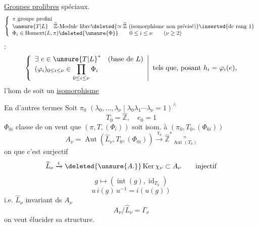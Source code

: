 \uline{Groupes prolibres} spéciaux.
\[
\left\{\begin{array}{l}
\pi\ \text{groupe profini}\\
\unsure{T|L}\quad\widehat{\mathbb Z}\text{-Module libre}
\deleted{\simeq\widehat{\mathbb Z}\text{ (isomorphisme non précisé)}}\inserted{\text{de rang }1}\\
\Phi_i\in\operatorname{Homext}(L,\pi)\deleted{\unsure{\Phi}}
\qquad0\leq i\leq\nu\qquad(\nu\geq2)
\end{array}\right.
\]
 :
\[
\left\{\begin{array}{l}
\exists\ e\in\unsure{T|L}^*\quad(\text{base de }L)\\
(\varphi_i)_{0\leq i\leq\nu}\in\displaystyle\prod_{0\leq i\leq\nu}\Phi_i
\end{array}\right|\ \text{tels que, posant }h_i=\varphi_i(e),
\]
l'hom de
soit un \uline{isomorphisme}

En d'autres termes
Soit $\pi_0$  
$(\lambda_0,\ldots,\lambda_\nu\mid\lambda_0\lambda_1\cdots\lambda_\nu=1)^{\wedge}$
\[
T_0=\widehat{\mathbb Z},\quad e_0=1
\]
$\Phi_{0i}$ classe de
on veut que $(\pi,T,(\Phi_i))$ soit isom. à $(\pi_0,T_0,(\Phi_{0i}))$
\[
A_\nu=\operatorname{Aut}(\widehat L_\nu,T_0,(\Phi_{0i}))
\xrightarrow{\chi_\nu}\widehat{\mathbb Z}^{*}
\underset{\operatorname{Aut}(T_0)}{\text{''}}
\]
on  que c'est surjectif
\[
\widehat L_\nu\xrightarrow{i}\deleted{\unsure{A.}}\operatorname{Ker}\chi_\nu\subset A_\nu
\qquad\text{injectif}
\]
\[
g\longmapsto(\operatorname{int}(g),\operatorname{id}_{T_0})
\]
\[
u\,i(g)\,u^{-1}=i(u(g))
\]
i.e. $\widehat L_\nu$ invariant ds $A_\nu$
\[
A_\nu/\widehat L_\nu=\Gamma_\nu
\]
on veut élucider sa structure.
